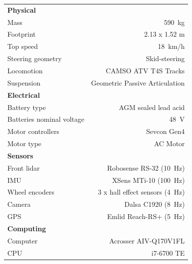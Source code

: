 \begin{figure} [h!]
	\centering
	\begin{minipage}[b]{1.0\linewidth}
		\centering
		\begin{tabular}[b]{l r} \toprule
			\textbf{Physical}         &                                      \\
			Mass                      & \SI{590}{kg}                         \\
			Footprint                 & 2.13 x 1.52 m                        \\
			Top speed                 & \SI{18}{km/h}                        \\
			Steering geometry         & Skid-steering                        \\
			Locomotion                & CAMSO ATV T4S Tracks                 \\
			Suspension                & Geometric Passive Articulation       \\
			\midrule
			\textbf{Electrical}                                              \\
			Battery type              & AGM sealed lead acid                 \\
			Batteries nominal voltage & \SI{48}{V}                           \\
			Motor controllers         & Sevcon Gen4                          \\
			Motor type                & AC Motor                             \\
			\midrule
			\textbf{Sensors}                                                 \\
			Front lidar               & Robosense RS-32 (\SI{10}{Hz})        \\
			\ac{IMU}                  & XSens MTi-10 (\SI{100}{Hz})          \\
			Wheel encoders            & 3 x hall effect sensors (\SI{4}{Hz}) \\
			Camera                    & Dalsa C1920 (\SI{8}{Hz})             \\
			\ac{GPS}                  & Emlid Reach-RS+ (\SI{5}{Hz})         \\
			\midrule
			\textbf{Computing}                                               \\
			Computer                  & Acrosser AIV-Q170V1FL                \\
			CPU                       & i7-6700 TE                           \\

\end{tabular}
\end{minipage}
\end{figure}

